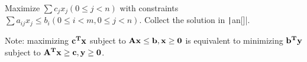 Maximize $\sum c_jx_j(0\le j<n)$ with constraints $\sum a_{ij}x_j\le b_i(0\le i<m,0\le j<n)$. Collect the solution in \texttt|an[]|.

Note: maximizing $\bf c^Tx$ subject to $\bf Ax\leq b,\bf x\geq 0$ is equivalent to minimizing $\bf b^Ty$ subject to $\bf A^Tx\geq c,\bf y\geq 0$. 

\inputminted{cpp}{src/mathematics/equality-and-inequality/simplex.cpp.com}

